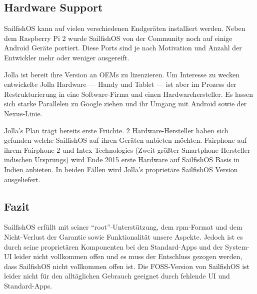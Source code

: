 \subsection{Hardware Support}
\mbox{SailfishOS} kann auf vielen verschiedenen Endgeräten installiert werden. Neben dem Raspberry Pi 2\thinspace\cite{online:sailfish-rpi2} wurde \mbox{SailfishOS} von der Community\thinspace\cite{online:sailfish-android-port} noch auf einige Android Geräte portiert. Diese Ports sind je nach Motivation und Anzahl der Entwickler mehr oder weniger ausgereift\thinspace\cite{online:sailfish-porters}.

Jolla ist bereit ihre Version an OEMs zu lizenzieren. Um Interesse zu wecken entwickelte Jolla Hardware --- Handy\thinspace\cite{online:jolla-smartphone} und Tablet\thinspace\cite{online:jolla-tablet} --- ist aber im Prozess der Restrukturierung in eine Software-Firma und einen Hardwarehersteller\thinspace\cite{online:jolla-googlelike}. Es lassen sich starke Parallelen zu Google ziehen und ihr Umgang mit Android sowie der Nexus-Linie.

Jolla's Plan trägt bereits erste Früchte. 2 Hardware-Hersteller haben sich gefunden welche \mbox{SailfishOS} auf ihren Geräten anbieten möchten. Fairphone auf ihrem Fairphone 2\thinspace\cite{online:jolla-fairphone2} und Intex Technologies (Zweit-größter Smartphone Hersteller indischen Ursprungs) wird Ende 2015 erste Hardware auf \mbox{SailfishOS} Basis in Indien anbieten\thinspace\cite{online:jolla-intex-pdf}. In beiden Fällen wird Jolla's proprietäre \mbox{SailfishOS} Version ausgeliefert.\\

\subsection{Fazit}
\mbox{SailfishOS} erfüllt mit seiner \mbox{``root''-Unterstützung}, dem rpm-Format und dem Nicht-Verlust der Garantie sowie Funktionalität unsere Aspekte. Jedoch ist es durch seine proprietären Komponenten bei den \mbox{Standard-Apps} und der \mbox{System-UI} leider nicht vollkommen offen und es muss der Entschluss gezogen werden, dass \mbox{SailfishOS} nicht vollkommen offen ist. Die FOSS-Version von \mbox{SailfishOS} ist leider nicht für den alltäglichen Gebrauch geeignet durch fehlende UI und Standard-Apps.